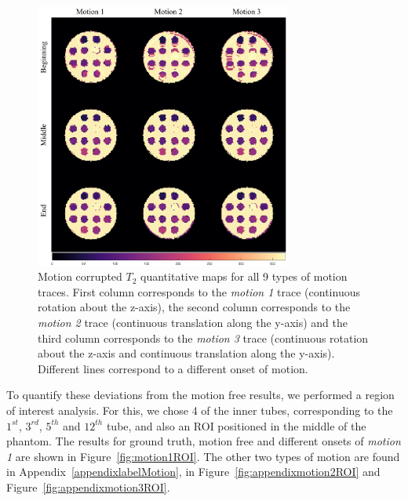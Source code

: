 \begin{figure}[ht]
    \centering
    \includegraphics[width=0.75\textwidth]{images/mrf/T2mapsmotion}
    \caption{Motion corrupted $T_2$ quantitative maps for all 9 types of motion traces. First column corresponds to the \textit{motion 1} trace (continuous rotation about the z-axis), the second column corresponds to the \textit{motion 2} trace (continuous translation along the y-axis) and the third column corresponds to the \textit{motion 3} trace (continuous rotation about the z-axis and continuous translation along the y-axis). Different lines correspond to a different onset of motion. }
    \label{fig:T2mapsmotion}
\end{figure}

\hfill

To quantify these deviations from the motion free results, we performed a region of interest analysis.
For this, we chose 4 of the inner tubes, corresponding to the $1^{st}$, $3^{rd}$, $5^{th}$ and $12^{th}$ tube, and also an ROI positioned in the middle of the phantom.
The results for ground truth, motion free and different onsets of \textit{motion 1} are shown in Figure~\ref{fig:motion1ROI}.
The other two types of motion are found in Appendix~\ref{appendixlabelMotion}, in Figure~\ref{fig:appendixmotion2ROI} and Figure~\ref{fig:appendixmotion3ROI}.

